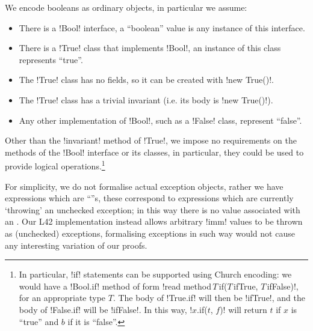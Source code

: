 We encode booleans as ordinary objects, in particular we assume:
\begin{itemize}
\item There is a \Q!Bool! interface, a ``boolean'' value is any instance of this interface.
\item There is a \Q!True! class that implements \Q!Bool!, an instance of this class represents ``true''.
\item The \Q!True! class has no fields, so it can be created with \Q!new True()!.
\item The \Q!True! class has a trivial invariant (i.e. its body is \Q!new True()!).
\item Any other implementation of \Q!Bool!, such as a \Q!False! class, represent ``false''.
\end{itemize}
Other than the \Q!invariant! method of \Q!True!, we impose no requirements on the methods of the \Q!Bool! interface or its classes, in particular, they could be used to provide logical operations.\footnote{
In particular, \Q!if! statements can be supported using Church encoding: we would have a \Q!Bool.i${}$f! method of form \Q!read method$\,T\,$i${}$f($T\,$ifTrue, $T\,$ifFalse)!, for an appropriate type $T$.
The body of \Q!True.i${}$f! will then be \Q!ifTrue!, and the body of \Q!False.i${}$f! will be \Q!ifFalse!. In this way, \Q!$x$.i${}$f($t$, $f$)! will return $t$ if $x$ is ``true'' and $b$ if it is ``false''.}

For simplicity, we do not formalise actual exception objects, rather we have expressions which are ``\error''s, these correspond to expressions which are currently `throwing' an unchecked exception;
in this way there is no value associated with an \error.
Our L42 implementation instead allows arbitrary \Q!imm! values to be thrown as (unchecked) exceptions, formalising exceptions in such way would not cause any interesting variation of our proofs.

